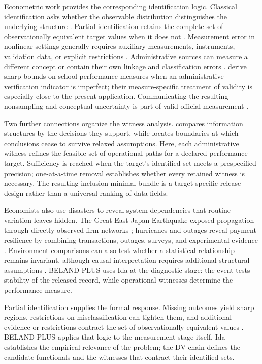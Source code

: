 \documentclass[11pt]{article}
\begin{document}
Econometric work provides the corresponding identification logic. Classical identification asks whether the observable distribution distinguishes the underlying structure \citep{KoopmansReiersol1950,Rothenberg1971,Lewbel2019}. Partial identification retains the complete set of observationally equivalent target values when it does not \citep{Manski1989,Manski1990,Manski2003,Molinari2020}. Measurement error in nonlinear settings generally requires auxiliary measurements, instruments, validation data, or explicit restrictions \citep{ChenHongNekipelov2011}. Administrative sources can measure a different concept or contain their own linkage and classification errors \citep{KapteynYpma2007}. \citet{DominitzSherman2006} derive sharp bounds on school-performance measures when an administrative verification indicator is imperfect; their measure-specific treatment of validity is especially close to the present application. Communicating the resulting nonsampling and conceptual uncertainty is part of valid official measurement \citep{Manski2015}.

Two further connections organize the witness analysis. \citet{Blackwell1953} compares information structures by the decisions they support, while \citet{MastenPoirier2020} locates boundaries at which conclusions cease to survive relaxed assumptions. Here, each administrative witness refines the feasible set of operational paths for a declared performance target. Sufficiency is reached when the target's identified set meets a prespecified precision; one-at-a-time removal establishes whether every retained witness is necessary. The resulting inclusion-minimal bundle is a target-specific release design rather than a universal ranking of data fields.

Economists also use disasters to reveal system dependencies that routine variation leaves hidden. The Great East Japan Earthquake exposed propagation through directly observed firm networks \citep{CarvalhoNireiSaitoTahbazSalehi2021}; hurricanes and outages reveal payment resilience by combining transactions, outages, surveys, and experimental evidence \citep{AlvarezArgenteVanPatten2026}. Environment comparisons can also test whether a statistical relationship remains invariant, although causal interpretation requires additional structural assumptions \citep{PetersBuhlmannMeinshausen2016}. BELAND-PLUS uses Ida at the diagnostic stage: the event tests stability of the released record, while operational witnesses determine the performance measure.

Partial identification supplies the formal response. Missing outcomes yield sharp regions, restrictions on misclassification can tighten them, and additional evidence or restrictions contract the set of observationally equivalent values \citep{Manski1990,Manski2003,HorowitzManski1995,Molinari2008,Molinari2020,Tamer2010}. BELAND-PLUS applies that logic to the measurement stage itself. Ida establishes the empirical relevance of the problem; the DV chain defines the candidate functionals and the witnesses that contract their identified sets.
\end{document}
